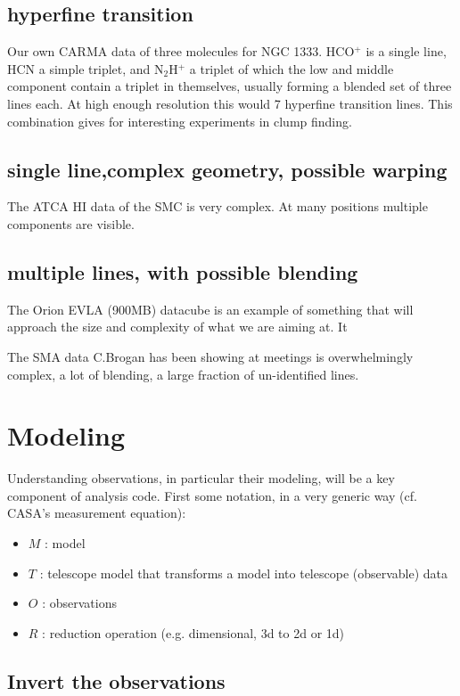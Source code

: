 \documentclass[preprint]{aastex} %
\begin{document}
\subsection{hyperfine transition}

Our own CARMA data of three molecules for NGC 1333.  HCO$^+$ is a single line,
HCN a simple triplet, and N$_2$H$^+$ a triplet of which the low and middle
component contain a triplet in themselves, usually forming a blended set of
three lines each. At high enough resolution this would 7 hyperfine transition
lines. This combination gives for interesting experiments in clump finding.

\subsection{single line,complex geometry, possible warping}

The ATCA HI data of the SMC is very complex. At many positions multiple components
are visible.

\subsection{multiple lines, with possible blending}

The Orion EVLA  (900MB) datacube is an example of something that will approach the size 
and complexity of what we are aiming at. It


The SMA data C.Brogan has been showing at meetings is overwhelmingly complex, a lot
of blending, a large fraction of un-identified lines.

\section{Modeling}

Understanding observations, in particular their modeling, will be a key component
of analysis code. First some notation, in a very generic way (cf. CASA's measurement
equation):
\begin{itemize}
\item 
$M$ : model
\item
$T$ : telescope model that transforms a model into telescope (observable) data
\item
$O$ : observations
\item
$R$ : reduction operation (e.g. dimensional, 3d to 2d or 1d)
\end{itemize}

\subsection{Invert the observations}
\end{document}
